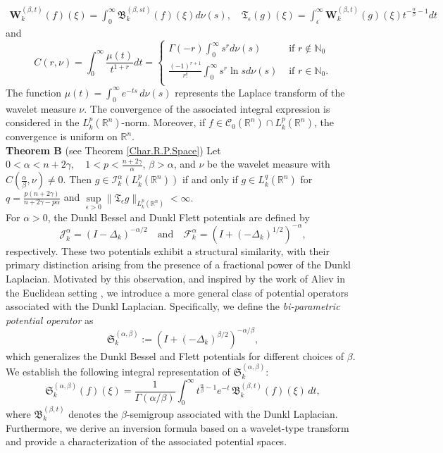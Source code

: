 \documentclass[11pt,a4paper,reqno]{amsproc}
\theoremstyle{definition}
\theoremstyle{remark}
\numberwithin{equation}{section}
\begin{document}
\begin{align*}
       \mathbf{W}_k^{(\beta,t)} (f)(\xi) = \int_0^\infty  \mathfrak{B}_k^{(\beta, st)}(f)(\xi) d\nu(s),\quad 
   \mathfrak{T}_\epsilon (g)(\xi) = \int_\epsilon^\infty  \mathbf{W}_k^{(\beta,t)}(g)(\xi) t^{-\frac{\alpha}{\beta}-1}dt
\end{align*} and 
\[ 
C(r,\nu) = \int_0^{\infty} \frac{\mu(t)}{t^{1+r}}dt =  
\begin{cases} 
  \Gamma(-r)\int_0^{\infty}s^{r}d\nu(s) & \text{ if } r \notin \mathbb{N}_0 \\ 
  \frac{(-1)^{r+1}}{r !} \int_0^{\infty}s^{r} \ln{s}d\nu(s) & \text{ if } r \in \mathbb{N}_0. \\  
\end{cases} 
\] 
The function \( \mu(t) = \int_0^{\infty} e^{-ts} \, d\nu(s) \) represents the Laplace transform of the wavelet measure \( \nu \). The convergence of the associated integral expression is considered in the  \( L_k^p(\mathbb{R}^n) \)-norm. Moreover, if \( f \in \mathcal{C}_0(\mathbb{R}^n) \cap L_k^p(\mathbb{R}^n) \), the convergence is uniform on \( \mathbb{R}^n \).\\

\noindent \textbf{Theorem B} (see Theorem \ref{Char.R.P.Space})
    Let $0<\alpha<n+2\gamma, \quad 1<p<\frac{n+2\gamma}{\alpha}$, $\beta > \alpha$, and $\nu$ be the wavelet measure with $C(\frac{\alpha}{\beta},\nu)\neq 0.$
    Then $g \in \mathcal{I}_k^\alpha(L_k^p(\mathbb{R}^n))$ if and only if $g \in L_k^q(\mathbb{R}^n)$ for  $q= \frac{p(n+2\gamma)}{n+2\gamma-p\alpha}$ and 
    $\underset{\epsilon>0}{\sup} \| \mathfrak{T}_\epsilon g\|_{L_k^p(\mathbb{R}^n)} < \infty.$\\

For \( \alpha > 0 \), the Dunkl Bessel and Dunkl Flett potentials are defined by \cite{Ben}
\[
\mathcal{J}_k^\alpha = \left(I - \Delta_k\right)^{-\alpha/2}
\quad \text{and} \quad
\mathcal{F}_k^\alpha = \left(I + (-\Delta_k)^{1/2} \right)^{-\alpha},
\]
respectively. These two potentials exhibit a structural similarity, with their primary distinction arising from the presence of a fractional power of the Dunkl Laplacian. Motivated by this observation, and inspired by the work of Aliev in the Euclidean setting \cite{Aliev}, we introduce a more general class of potential operators associated with the Dunkl Laplacian. Specifically, we define the \emph{bi-parametric potential operator} as
\[
\mathfrak{S}_k^{(\alpha, \beta)} := \left( I + \left( -\Delta_k \right)^{\beta/2} \right)^{-\alpha/\beta},
\]
which generalizes the Dunkl Bessel and Flett potentials for different choices of \( \beta \).
We establish the following integral representation of \( \mathfrak{S}_k^{(\alpha, \beta)} \):
\[
\mathfrak{S}_k^{(\alpha, \beta)} (f)(\xi) = \frac{1}{\Gamma(\alpha/\beta)} \int_0^\infty t^{\frac{\alpha}{\beta}-1} e^{-t} \, \mathfrak{B}_k^{(\beta, t)} (f)(\xi) \, dt,
\]
where \( \mathfrak{B}_k^{(\beta, t)} \) denotes the \(\beta\)-semigroup associated with the Dunkl Laplacian. Furthermore, we derive an inversion formula based on a wavelet-type transform and provide a characterization of the associated potential spaces. \\
\end{document}
